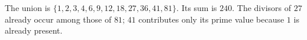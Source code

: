 The union is $\{1,2,3,4,6,9,12,18,27,36,41,81\}$. Its sum is $\boxed{240}$. The divisors of $27$ already occur among those of $81$; $41$ contributes only its prime value because $1$ is already present.
